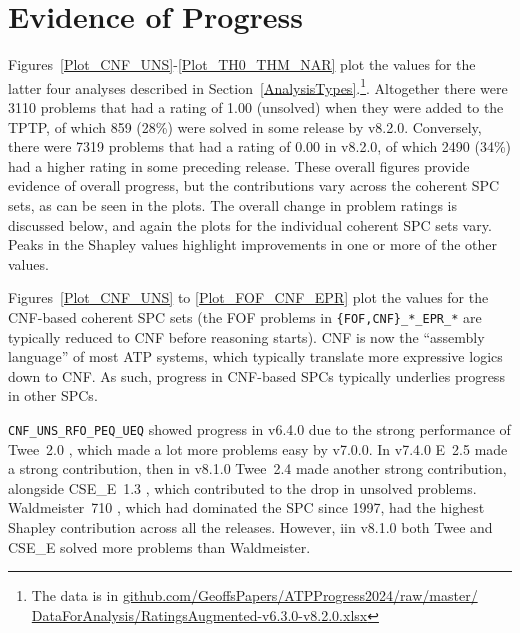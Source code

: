 \documentclass[runningheads]{llncs}
\begin{document}
\section{Evidence of Progress}
\label{Evidence}

Figures~\ref{Plot_CNF_UNS}-\ref{Plot_TH0_THM_NAR} plot the values for the latter four analyses
described in Section~\ref{AnalysisTypes}.\footnote{%
The data is in \href{https://github.com/GeoffsPapers/ATPProgress2024/raw/master/DataForAnalysis/RatingsNoMissing-v6.3.0-v8.2.0.xlsx}{github.com/GeoffsPapers/ATPProgress2024/raw/master/} 
\href{https://github.com/GeoffsPapers/ATPProgress2024/raw/master/DataForAnalysis/RatingsAugmented-v6.3.0-v8.2.0.xlsx}{DataForAnalysis/RatingsAugmented-v6.3.0-v8.2.0.xlsx}}.
Altogether there were 3110 problems that had a rating of 1.00 (unsolved) when they were added to
the TPTP, of which 859 (28\%) were solved in some release by v8.2.0. 
Conversely, there were 7319 problems that had a rating of 0.00 in v8.2.0, of which 2490 (34\%) 
had a higher rating in some preceding release.
These overall figures provide evidence of overall progress, but the contributions vary across
the coherent SPC sets, as can be seen in the plots.
The overall change in problem ratings is discussed below, and again the plots for the individual
coherent SPC sets vary.
Peaks in the Shapley values highlight improvements in one or more of the other values.

Figures~\ref{Plot_CNF_UNS} to \ref{Plot_FOF_CNF_EPR} plot the values for the CNF-based coherent 
SPC sets (the FOF problems in {\tt \{FOF,CNF\}\_*\_EPR\_*} are typically reduced to CNF before
reasoning starts).
CNF is now the ``assembly language'' of most ATP systems, which typically translate more
expressive logics down to CNF.
As such, progress in CNF-based SPCs typically underlies progress in other SPCs.

{\tt CNF\_UNS\_RFO\_PEQ\_UEQ} showed progress in v6.4.0 due to the strong performance of
Twee~2.0 \cite{Sma21}, which made a lot more problems easy by v7.0.0.
In v7.4.0 E~2.5 made a strong contribution, then in v8.1.0 Twee~2.4 made another strong 
contribution, alongside CSE\_E~1.3 \cite{XL+18}, which contributed to the drop in unsolved
problems.
Waldmeister~710 \cite{LH02}, which had dominated the SPC since 1997, had the highest Shapley 
contribution across all the releases.
However, iin v8.1.0 both Twee and CSE\_E solved more problems than Waldmeister.
 
\end{document}
